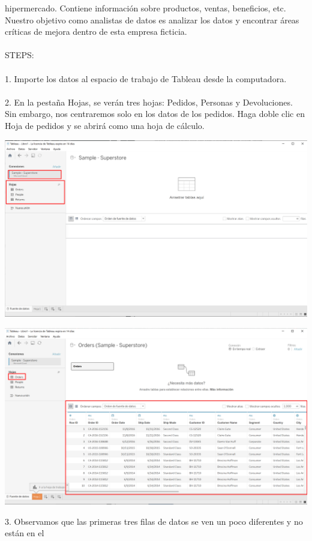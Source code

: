 \documentclass[12pt,letterpaper]{article}
\begin{document}
hipermercado. Contiene información sobre productos, ventas, beneficios, etc. Nuestro objetivo como
analistas de datos es analizar los datos y encontrar áreas críticas de mejora dentro de esta empresa
ficticia.
\\\\STEPS:
\\\\1. Importe los datos al espacio de trabajo de Tableau desde la computadora.
\\\\2. En la pestaña Hojas, se verán tres hojas: Pedidos, Personas y Devoluciones. Sin embargo, nos
centraremos solo en los datos de los pedidos. Haga doble clic en Hoja de pedidos y se abrirá
como una hoja de cálculo.
\begin{center}
    \includegraphics[width=16cm]{img/3.png}  
\end{center}
\begin{center}
    \includegraphics[width=16cm]{img/4.png}  
\end{center}
3. Observamos que las primeras tres filas de datos se ven un poco diferentes y no están en el
\end{document}
